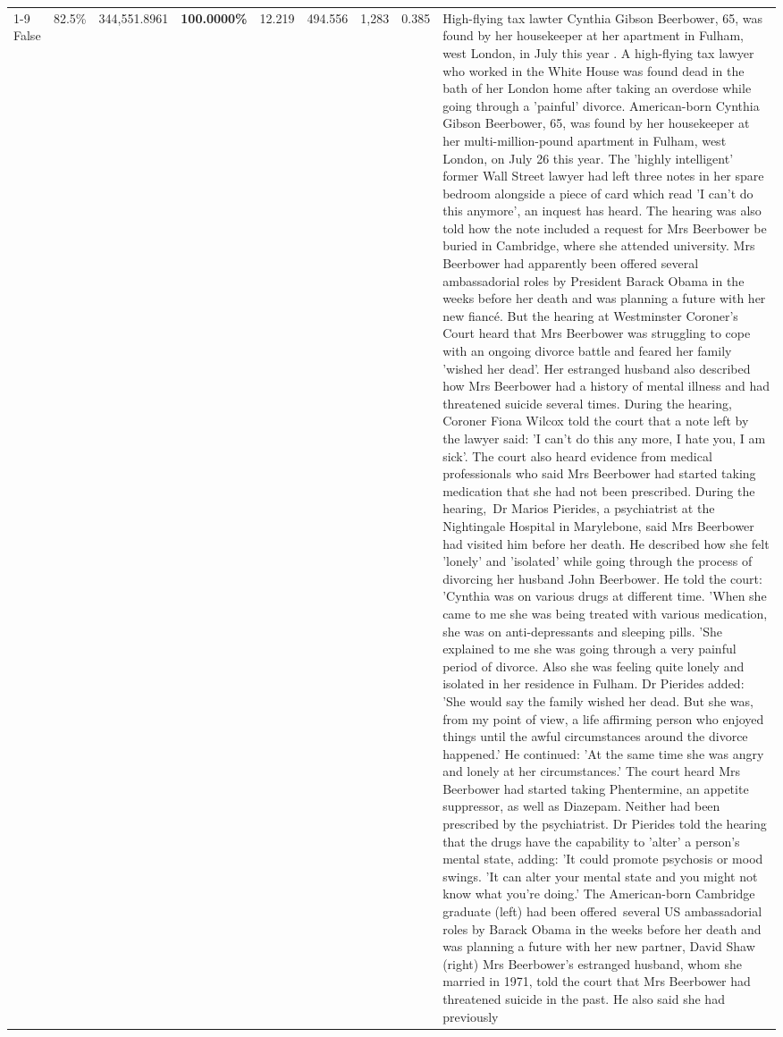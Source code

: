 \begin{table}[H]
\begin{tabular}{lllrlllll}
\cline{1-9}
False & 82.5\% & 344,551.8961 & \bfseries \color{red} 100.0000\% & 12.219 & 494.556 & 1,283 & 0.385 & High-flying tax lawter Cynthia Gibson Beerbower, 65, was found by her housekeeper at her apartment in Fulham, west London, in July this year . A high-flying tax lawyer who worked in the White House was found dead in the bath of her London home after taking an overdose while going through a 'painful' divorce. American-born Cynthia Gibson Beerbower, 65, was found by her housekeeper at her multi-million-pound apartment in Fulham, west London, on July 26 this year. The 'highly intelligent' former Wall Street lawyer had left three notes in her spare bedroom alongside a piece of card which read 'I can't do this anymore', an inquest has heard. The hearing was also told how the note included a request for Mrs Beerbower be buried in Cambridge, where she attended university. Mrs Beerbower had apparently been offered several ambassadorial roles by President Barack Obama in the weeks before her death and was planning a future with her new fiancé. But the hearing at Westminster Coroner's Court heard that Mrs Beerbower was struggling to cope with an ongoing divorce battle and feared her family 'wished her dead'. Her estranged husband also described how Mrs Beerbower had a history of mental illness and had threatened suicide several times. During the hearing, Coroner Fiona Wilcox told the court that a note left by the lawyer said: 'I can't do this any more, I hate you, I am sick'. The court also heard evidence from medical professionals who said Mrs Beerbower had started taking medication that she had not been prescribed. During the hearing, Dr Marios Pierides, a psychiatrist at the Nightingale Hospital in Marylebone, said Mrs Beerbower had visited him before her death. He described how she felt 'lonely' and 'isolated' while going through the process of divorcing her husband John Beerbower. He told the court: 'Cynthia was on various drugs at different time. 'When she came to me she was being treated with various medication, she was on anti-depressants and sleeping pills. 'She explained to me she was going through a very painful period of divorce. Also she was feeling quite lonely and isolated in her residence in Fulham. Dr Pierides added: 'She would say the family wished her dead. But she was, from my point of view, a life affirming person who enjoyed things until the awful circumstances around the divorce happened.' He continued: 'At the same time she was angry and lonely at her circumstances.' The court heard Mrs Beerbower had started taking Phentermine, an appetite suppressor, as well as Diazepam. Neither had been prescribed by the psychiatrist. Dr Pierides told the hearing that the drugs have the capability to 'alter' a person's mental state, adding: 'It could promote psychosis or mood swings. 'It can alter your mental state and you might not know what you're doing.' The American-born Cambridge graduate (left) had been offered several US ambassadorial roles by Barack Obama in the weeks before her death and was planning a future with her new partner, David Shaw (right) Mrs Beerbower's estranged husband, whom she married in 1971, told the court that Mrs Beerbower had threatened suicide in the past. He also said she had previously 
\end{tabular}
\end{table}
